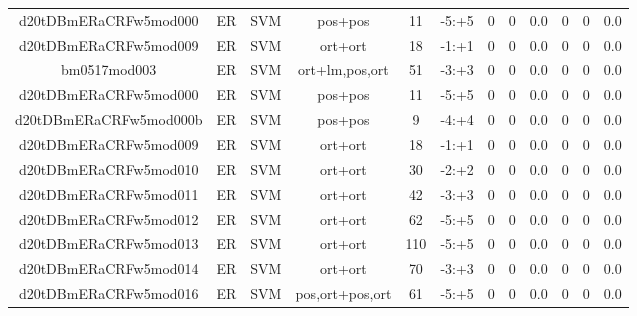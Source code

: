 \documentclass[a4paper]{article}
\begin{document}
\begin{landscape}
\begin{center}
\begin{tabular}{ |c|c|c|c|c|c|c|c|c|c|c|c|}
 
 	
 	\small{ d20tDBmERaCRFw5mod000 } & ER & SVM & pos+pos  &  11 &  -5:+5  &  0 & 0 & 0.0  &  0 & 0 & 0.0 \\
 	

 
 	
 	\small{ d20tDBmERaCRFw5mod009 } & ER & SVM & ort+ort  &  18 &  -1:+1  &  0 & 0 & 0.0  &  0 & 0 & 0.0 \\
 	

 
 	
 	\small{ bm0517mod003 } & ER & SVM & ort+lm,pos,ort  &  51 &  -3:+3  &  0 & 0 & 0.0  &  0 & 0 & 0.0 \\
 	

 
 	
 	\small{ d20tDBmERaCRFw5mod000 } & ER & SVM & pos+pos  &  11 &  -5:+5  &  0 & 0 & 0.0  &  0 & 0 & 0.0 \\
 	

 
 	
 	\small{ d20tDBmERaCRFw5mod000b } & ER & SVM & pos+pos  &  9 &  -4:+4  &  0 & 0 & 0.0  &  0 & 0 & 0.0 \\
 	

 
 	
 	\small{ d20tDBmERaCRFw5mod009 } & ER & SVM & ort+ort  &  18 &  -1:+1  &  0 & 0 & 0.0  &  0 & 0 & 0.0 \\
 	

 
 	
 	\small{ d20tDBmERaCRFw5mod010 } & ER & SVM & ort+ort  &  30 &  -2:+2  &  0 & 0 & 0.0  &  0 & 0 & 0.0 \\
 	

 
 	
 	\small{ d20tDBmERaCRFw5mod011 } & ER & SVM & ort+ort  &  42 &  -3:+3  &  0 & 0 & 0.0  &  0 & 0 & 0.0 \\
 	

 
 	
 	\small{ d20tDBmERaCRFw5mod012 } & ER & SVM & ort+ort  &  62 &  -5:+5  &  0 & 0 & 0.0  &  0 & 0 & 0.0 \\
 	

 
 	
 	\small{ d20tDBmERaCRFw5mod013 } & ER & SVM & ort+ort  &  110 &  -5:+5  &  0 & 0 & 0.0  &  0 & 0 & 0.0 \\
 	

 
 	
 	\small{ d20tDBmERaCRFw5mod014 } & ER & SVM & ort+ort  &  70 &  -3:+3  &  0 & 0 & 0.0  &  0 & 0 & 0.0 \\
 	

 
 	
 	\small{ d20tDBmERaCRFw5mod016 } & ER & SVM & pos,ort+pos,ort  &  61 &  -5:+5  &  0 & 0 & 0.0  &  0 & 0 & 0.0 \\
 	


\end{tabular}
\end{center}
\end{landscape}
\end{document}
